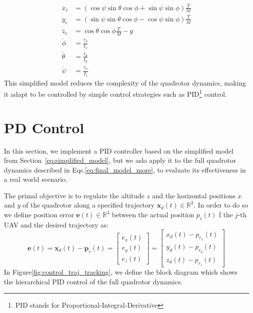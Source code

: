 \begin{subequations}
\begin{align}
    \ddot{x}_r &= (\cos\psi \sin\theta \cos\phi + \sin\psi \sin\phi) \frac{T}{M} \label{eq:position_control_x}\\[6pt] 
    \ddot{y}_r &= (\sin\psi \sin\theta \cos\phi - \cos\psi \sin\phi) \frac{T}{M} \label{eq:position_control_y}\\[6pt] 
    \ddot{z}_r &= \cos\theta \cos\phi \frac{T}{M} - g  \label{eq:position_control_z}\\[6pt] 
    \dot{\phi} &= \frac{\tau_{\phi}}{I_x} \\[8pt]
    \dot{\theta} &= \frac{\tau_{\theta}}{I_y} \\[8pt]
    \dot{\psi} &= \frac{\tau_{\psi}}{I_z}
\end{align}
\label{eq:simplified_model}
\end{subequations}
This simplified model reduces the complexity of the quadrotor dynamics,
making it adapt to be controlled by simple control strategies such as 
PID\footnote{PID stands for Proportional-Integral-Derivative} control.

\section{PD Control}
\label{sec:PID_control}
In this section, we implement a PID controller 
based on the simplified model from Section~\ref{eq:simplified_model},
but we aslo apply it to the full quadrotor dynamics described in Eqs.\ref{eq:final_model_more},
to evaluate its effectiveness in a real world scenario.

The primal objective is to regulate the altitude $z$ and the 
horizontal positions \( x \) and \( y \) of the quadrotor along a 
specified trajectory $\mathbf{x}_d(t) \in \mathbb{R}^3$.
In order to do so we define position error $\mathbf{e}(t) \in \mathbb{R}^3$
between the actual position $p_r(t)$ f the $j$-th UAV and the desired trajectory as:
\[
    \mathbf{e}(t) = \mathbf{x}_d(t) - \mathbf{p}_r(t) = 
    \begin{bmatrix}
        e_x(t) \\
        e_y(t) \\
        e_z(t)
    \end{bmatrix} =
    \begin{bmatrix}
        x_d(t) - p_{r_x}(t) \\
        y_d(t) - p_{r_y}(t) \\
        z_d(t) - p_{r_z}(t)
    \end{bmatrix}
\]
In Figure\ref{fig:control_traj_tracking}, we define the block
diagram which shows the hierarchical PID control of the full 
quadrotor dynamics.


